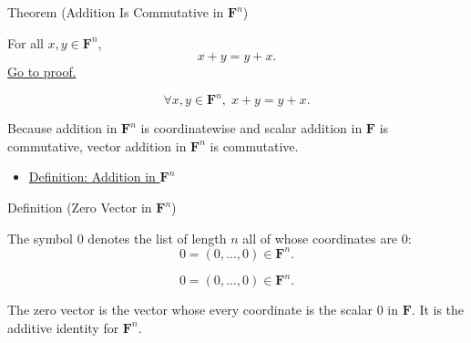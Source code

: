 
\begin{theorembox}{Theorem (Addition Is Commutative in $\mathbf{F}^n$)}
\begin{theorem}
\label{thm:addition-commutative-in-fn}
For all $x,y \in \mathbf{F}^n$,
\[
x+y=y+x.
\]
\hyperref[prf:addition-commutative-in-fn]{Go to proof.}
\end{theorem}
\end{theorembox}

\begin{remark*}
\[
\forall x,y \in \mathbf{F}^n,\; x+y=y+x.
\]
\end{remark*}

\begin{remark*}[Interpretation]
Because addition in $\mathbf{F}^n$ is coordinatewise and scalar addition in
$\mathbf{F}$ is commutative, vector addition in $\mathbf{F}^n$ is commutative.
\end{remark*}

\begin{dependencies}
\begin{itemize}
  \item \hyperref[def:addition-in-fn]{Definition: Addition in $\mathbf{F}^n$}
\end{itemize}
\end{dependencies}


\begin{definitionbox}{Definition (Zero Vector in $\mathbf{F}^n$)}
\begin{definition}
\label{def:zero-vector-in-fn}
The symbol $0$ denotes the list of length $n$ all of whose coordinates are $0$:
\[
0=(0,\dots,0)\in \mathbf{F}^n.
\]
\end{definition}
\end{definitionbox}

\begin{remark*}
\[
0=(0,\dots,0)\in \mathbf{F}^n.
\]
\end{remark*}

\begin{remark*}[Interpretation]
The zero vector is the vector whose every coordinate is the scalar $0$ in
$\mathbf{F}$. It is the additive identity for $\mathbf{F}^n$.
\end{remark*}

